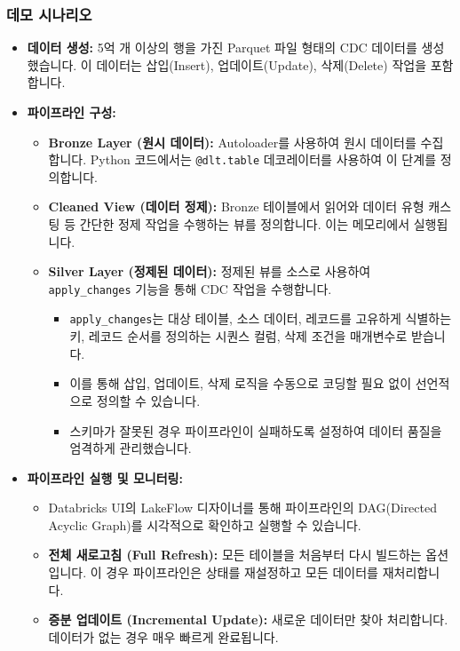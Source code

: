 \documentclass[11pt,a4paper]{article}
\theoremstyle{definition}
\begin{document}
\begin{enumerate}
\subsubsection{데모 시나리오}
\begin{itemize}
    \item \textbf{데이터 생성:} 5억 개 이상의 행을 가진 Parquet 파일 형태의 CDC 데이터를 생성했습니다. 이 데이터는 삽입(Insert), 업데이트(Update), 삭제(Delete) 작업을 포함합니다.
    \item \textbf{파이프라인 구성:}
    \begin{itemize}
        \item \textbf{Bronze Layer (원시 데이터):} Autoloader를 사용하여 원시 데이터를 수집합니다. Python 코드에서는 \texttt{@dlt.table} 데코레이터를 사용하여 이 단계를 정의합니다.
        \item \textbf{Cleaned View (데이터 정제):} Bronze 테이블에서 읽어와 데이터 유형 캐스팅 등 간단한 정제 작업을 수행하는 뷰를 정의합니다. 이는 메모리에서 실행됩니다.
        \item \textbf{Silver Layer (정제된 데이터):} 정제된 뷰를 소스로 사용하여 \texttt{apply_changes} 기능을 통해 CDC 작업을 수행합니다.
        \begin{itemize}
            \item \texttt{apply_changes}는 대상 테이블, 소스 데이터, 레코드를 고유하게 식별하는 키, 레코드 순서를 정의하는 시퀀스 컬럼, 삭제 조건을 매개변수로 받습니다.
            \item 이를 통해 삽입, 업데이트, 삭제 로직을 수동으로 코딩할 필요 없이 선언적으로 정의할 수 있습니다.
            \item 스키마가 잘못된 경우 파이프라인이 실패하도록 설정하여 데이터 품질을 엄격하게 관리했습니다.
        \end{itemize}
    \end{itemize}
    \item \textbf{파이프라인 실행 및 모니터링:}
    \begin{itemize}
        \item Databricks UI의 LakeFlow 디자이너를 통해 파이프라인의 DAG(Directed Acyclic Graph)를 시각적으로 확인하고 실행할 수 있습니다.
        \item \textbf{전체 새로고침 (Full Refresh):} 모든 테이블을 처음부터 다시 빌드하는 옵션입니다. 이 경우 파이프라인은 상태를 재설정하고 모든 데이터를 재처리합니다.
        \item \textbf{증분 업데이트 (Incremental Update):} 새로운 데이터만 찾아 처리합니다. 데이터가 없는 경우 매우 빠르게 완료됩니다.

\end{itemize}
\end{itemize}
\end{enumerate}
\end{document}
